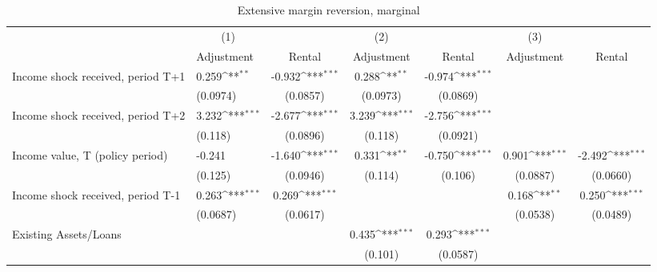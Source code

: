 \begin{table}[htbp]\centering
\def\sym#1{\ifmmode^{#1}\else\(^{#1}\)\fi}
\caption{Extensive margin reversion, marginal}
\begin{tabular}{p{0.8in}l*{5}{c}}
\hline\hline
                    &\multicolumn{1}{c}{(1)}         &                     &\multicolumn{1}{c}{(2)}         &                     &\multicolumn{1}{c}{(3)}         &                     \\
                    &  Adjustment         &      Rental         &  Adjustment         &      Rental         &  Adjustment         &      Rental         \\
\hline
Income shock received, period T+1&       0.259\sym{**} &      -0.932\sym{***}&       0.288\sym{**} &      -0.974\sym{***}&                     &                     \\
                    &    (0.0974)         &    (0.0857)         &    (0.0973)         &    (0.0869)         &                     &                     \\
Income shock received, period T+2&       3.232\sym{***}&      -2.677\sym{***}&       3.239\sym{***}&      -2.756\sym{***}&                     &                     \\
                    &     (0.118)         &    (0.0896)         &     (0.118)         &    (0.0921)         &                     &                     \\
Income value, T (policy period)&      -0.241         &      -1.640\sym{***}&       0.331\sym{**} &      -0.750\sym{***}&       0.901\sym{***}&      -2.492\sym{***}\\
                    &     (0.125)         &    (0.0946)         &     (0.114)         &     (0.106)         &    (0.0887)         &    (0.0660)         \\
Income shock received, period T-1&       0.263\sym{***}&       0.269\sym{***}&                     &                     &       0.168\sym{**} &       0.250\sym{***}\\
                    &    (0.0687)         &    (0.0617)         &                     &                     &    (0.0538)         &    (0.0489)         \\
Existing Assets/Loans&                     &                     &       0.435\sym{***}&       0.293\sym{***}&                     &                     \\
                    &                     &                     &     (0.101)         &    (0.0587)         &                     &                     \\

\end{tabular}
\end{table}
